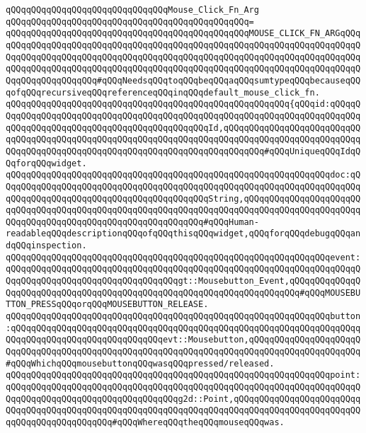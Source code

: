 \newline
\newline
\newline
\verb|qQQqqQQqqQQqqQQqqQQqqQQqqQQqqQQqMouse_Click_Fn_Arg|\newline
\verb|qQQqqQQqqQQqqQQqqQQqqQQqqQQqqQQqqQQqqQQqqQQqqQQq=|\newline
\verb|qQQqqQQqqQQqqQQqqQQqqQQqqQQqqQQqqQQqqQQqqQQqqQQqMOUSE_CLICK_FN_ARGqQQqqQQqqQQqqQQqqQQqqQQqqQQqqQQqqQQqqQQqqQQqqQQqqQQqqQQqqQQqqQQqqQQqqQQqqQQqqQQqqQQqqQQqqQQqqQQqqQQqqQQqqQQqqQQqqQQqqQQqqQQqqQQqqQQqqQQqqQQqqQQqqQQqqQQqqQQqqQQqqQQqqQQqqQQqqQQqqQQqqQQqqQQqqQQqqQQqqQQqqQQqqQQqqQQqqQQqqQQqqQQqqQQqqQQq#qQQqNeedsqQQqtoqQQqbeqQQqaqQQqsumtypeqQQqbecauseqQQqofqQQqrecursiveqQQqreferenceqQQqinqQQqdefault_mouse_click_fn.|\newline
\verb|qQQqqQQqqQQqqQQqqQQqqQQqqQQqqQQqqQQqqQQqqQQqqQQqqQQqqQQq{qQQqid:qQQqqQQqqQQqqQQqqQQqqQQqqQQqqQQqqQQqqQQqqQQqqQQqqQQqqQQqqQQqqQQqqQQqqQQqqQQqqQQqqQQqqQQqqQQqqQQqqQQqqQQqqQQqqQQqqQQqId,qQQqqQQqqQQqqQQqqQQqqQQqqQQqqQQqqQQqqQQqqQQqqQQqqQQqqQQqqQQqqQQqqQQqqQQqqQQqqQQqqQQqqQQqqQQqqQQqqQQqqQQqqQQqqQQqqQQqqQQqqQQqqQQqqQQqqQQqqQQqqQQqqQQq#qQQqUniqueqQQqIdqQQqforqQQqwidget.|\newline
\verb|qQQqqQQqqQQqqQQqqQQqqQQqqQQqqQQqqQQqqQQqqQQqqQQqqQQqqQQqqQQqqQQqdoc:qQQqqQQqqQQqqQQqqQQqqQQqqQQqqQQqqQQqqQQqqQQqqQQqqQQqqQQqqQQqqQQqqQQqqQQqqQQqqQQqqQQqqQQqqQQqqQQqqQQqqQQqqQQqqQQqString,qQQqqQQqqQQqqQQqqQQqqQQqqQQqqQQqqQQqqQQqqQQqqQQqqQQqqQQqqQQqqQQqqQQqqQQqqQQqqQQqqQQqqQQqqQQqqQQqqQQqqQQqqQQqqQQqqQQqqQQqqQQqqQQqqQQq#qQQqHuman-readableqQQqdescriptionqQQqofqQQqthisqQQqwidget,qQQqforqQQqdebugqQQqandqQQqinspection.|\newline
\verb|qQQqqQQqqQQqqQQqqQQqqQQqqQQqqQQqqQQqqQQqqQQqqQQqqQQqqQQqqQQqqQQqevent:qQQqqQQqqQQqqQQqqQQqqQQqqQQqqQQqqQQqqQQqqQQqqQQqqQQqqQQqqQQqqQQqqQQqqQQqqQQqqQQqqQQqqQQqqQQqqQQqqQQqqQQqgt::Mousebutton_Event,qQQqqQQqqQQqqQQqqQQqqQQqqQQqqQQqqQQqqQQqqQQqqQQqqQQqqQQqqQQqqQQqqQQqqQQq#qQQqMOUSEBUTTON_PRESSqQQqorqQQqMOUSEBUTTON_RELEASE.|\newline
\verb|qQQqqQQqqQQqqQQqqQQqqQQqqQQqqQQqqQQqqQQqqQQqqQQqqQQqqQQqqQQqqQQqbutton:qQQqqQQqqQQqqQQqqQQqqQQqqQQqqQQqqQQqqQQqqQQqqQQqqQQqqQQqqQQqqQQqqQQqqQQqqQQqqQQqqQQqqQQqqQQqqQQqqQQqevt::Mousebutton,qQQqqQQqqQQqqQQqqQQqqQQqqQQqqQQqqQQqqQQqqQQqqQQqqQQqqQQqqQQqqQQqqQQqqQQqqQQqqQQqqQQqqQQqqQQq#qQQqWhichqQQqmousebuttonqQQqwasqQQqpressed/released.|\newline
\verb|qQQqqQQqqQQqqQQqqQQqqQQqqQQqqQQqqQQqqQQqqQQqqQQqqQQqqQQqqQQqqQQqpoint:qQQqqQQqqQQqqQQqqQQqqQQqqQQqqQQqqQQqqQQqqQQqqQQqqQQqqQQqqQQqqQQqqQQqqQQqqQQqqQQqqQQqqQQqqQQqqQQqqQQqqQQqg2d::Point,qQQqqQQqqQQqqQQqqQQqqQQqqQQqqQQqqQQqqQQqqQQqqQQqqQQqqQQqqQQqqQQqqQQqqQQqqQQqqQQqqQQqqQQqqQQqqQQqqQQqqQQqqQQqqQQqqQQq#qQQqWhereqQQqtheqQQqmouseqQQqwas.|\newline

